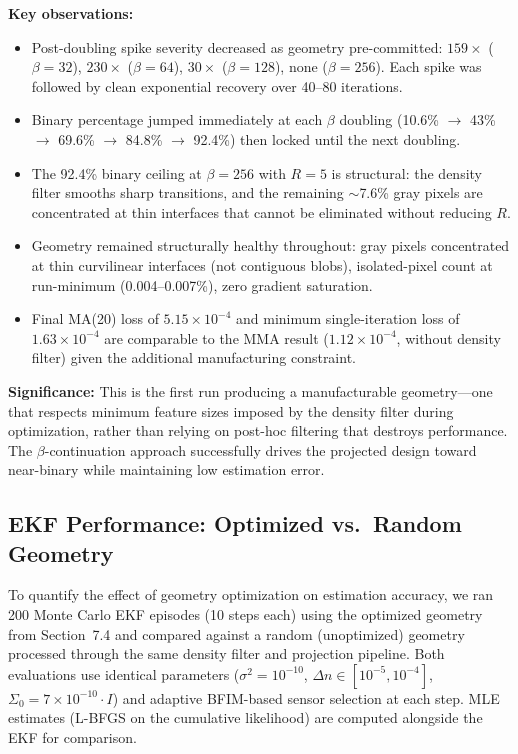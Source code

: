 \documentclass[11pt,a4paper]{article}
\begin{document}
\textbf{Key observations:}
\begin{itemize}[nosep]
  \item Post-doubling spike severity decreased as geometry pre-committed: $159\times$ ($\beta{=}32$), $230\times$ ($\beta{=}64$), $30\times$ ($\beta{=}128$), none ($\beta{=}256$).  Each spike was followed by clean exponential recovery over 40--80 iterations.
  \item Binary percentage jumped immediately at each $\beta$ doubling (10.6\% $\to$ 43\% $\to$ 69.6\% $\to$ 84.8\% $\to$ 92.4\%) then locked until the next doubling.
  \item The 92.4\% binary ceiling at $\beta = 256$ with $R = 5$ is structural: the density filter smooths sharp transitions, and the remaining $\sim$7.6\% gray pixels are concentrated at thin interfaces that cannot be eliminated without reducing $R$.
  \item Geometry remained structurally healthy throughout: gray pixels concentrated at thin curvilinear interfaces (not contiguous blobs), isolated-pixel count at run-minimum (0.004--0.007\%), zero gradient saturation.
  \item Final MA(20) loss of $5.15 \times 10^{-4}$ and minimum single-iteration loss of $1.63 \times 10^{-4}$ are comparable to the MMA result ($1.12 \times 10^{-4}$, without density filter) given the additional manufacturing constraint.
\end{itemize}

\textbf{Significance:} This is the first run producing a manufacturable geometry---one that respects minimum feature sizes imposed by the density filter during optimization, rather than relying on post-hoc filtering that destroys performance.  The $\beta$-continuation approach successfully drives the projected design toward near-binary while maintaining low estimation error.

\subsection{EKF Performance: Optimized vs.\ Random Geometry}

To quantify the effect of geometry optimization on estimation accuracy, we ran 200 Monte Carlo EKF episodes (10 steps each) using the optimized geometry from Section~7.4 and compared against a random (unoptimized) geometry processed through the same density filter and projection pipeline.  Both evaluations use identical parameters ($\sigma^2 = 10^{-10}$, $\Delta n \in [10^{-5}, 10^{-4}]$, $\Sigma_0 = 7 \times 10^{-10} \cdot I$) and adaptive BFIM-based sensor selection at each step.  MLE estimates (L-BFGS on the cumulative likelihood) are computed alongside the EKF for comparison.
\end{document}
